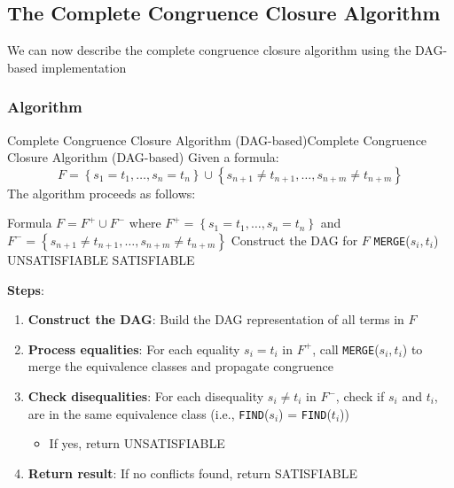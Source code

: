 \documentclass[a4paper]{article}
\theoremstyle{definition}
\begin{document}
\subsection{The Complete Congruence Closure Algorithm}
We can now describe the complete congruence closure algorithm using the DAG-based implementation
\subsubsection{Algorithm}
\begin{theorem}{Complete Congruence Closure Algorithm (DAG-based)}{Complete Congruence Closure Algorithm (DAG-based)}
Given a formula:
\[
  F = \left\{ s_1 = t_1, \ldots, s_n = t_n \right\} \cup \left\{ s_{n + 1} \neq t_{n + 1}, \ldots, s_{n + m} \neq t_{n + m} \right\}
\]
The algorithm proceeds as follows:
\begin{algorithm}[H]
	\caption{Complete Congruence Closure Algorithm (DAG-based)}
	\begin{algorithmic}[2]
		\Require Formula $F = F^+ \cup F^-$ where $F^+ = \left\{ s_1 = t_1, \ldots, s_n = t_n \right\}$ and
		$F^- = \left\{ s_{n + 1} \neq t_{n + 1}, \ldots, s_{n + m} \neq t_{n + m} \right\}$
		\State Construct the DAG for \( F \)
			\State \texttt{MERGE}($s_i, t_i$)
		\EndFor
				\State \Return UNSATISFIABLE 
			\EndIf
		\EndFor
		\State \Return SATISFIABLE
	\end{algorithmic}
\end{algorithm}
\end{theorem}
\textbf{Steps}:
\begin{enumerate}
	\item \textbf{Construct the DAG}: Build the DAG representation of all terms in \( F \)   
	\item \textbf{Process equalities}: For each equality \( s_i = t_i \) in \( F^+ \), call \texttt{MERGE}($s_i, t_i$) to merge the equivalence classes and propagate congruence 
	\item \textbf{Check disequalities}: For each disequality $s_i \neq t_i$ in $F^-$, check if $s_i$ and $t_i$, are in the same equivalence class (i.e., \texttt{FIND}($s_i$) = \texttt{FIND}($t_i$))
	\begin{itemize}
		\item If yes, return UNSATISFIABLE
	\end{itemize}
	\item \textbf{Return result}: If no conflicts found, return SATISFIABLE
\end{enumerate}
\end{document}
